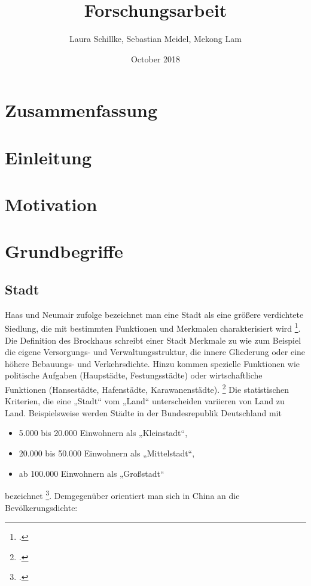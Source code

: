 \documentclass{scrartcl}
\title{Forschungsarbeit}
\author{Laura Schillke, Sebastian Meidel, Mekong Lam }
\date{October 2018}
\begin{document}
\maketitle


\newpage

\setcounter{tocdepth}{3}
\tableofcontents 



\newpage

\section{Zusammenfassung}

\section{Einleitung}

\section{Motivation}

\section{Grundbegriffe}

\subsection{Stadt}

Haas und Neumair zufolge bezeichnet man eine Stadt als eine größere verdichtete Siedlung, die mit bestimmten Funktionen und Merkmalen charakterisiert wird \footcite{HaasDefinitionWirtschaftslexikon}. Die Definition des Brockhaus schreibt einer Stadt Merkmale zu wie zum Beispiel die eigene Versorgungs- und Verwaltungsstruktur, die innere Gliederung oder eine höhere Bebauungs- und Verkehrsdichte. Hinzu kommen spezielle Funktionen wie politische Aufgaben (Haupstädte, Festungsstädte) oder wirtschaftliche Funktionen (Hansestädte, Hafenstädte, Karawanenstädte). \footcite{BrockhausStadt} Die statistischen Kriterien, die eine „Stadt“ vom „Land“ unterscheiden variieren von Land zu Land. Beispielsweise werden Städte in der Bundesrepublik Deutschland mit 
\begin{itemize}
\item 5.000 bis 20.000 Einwohnern als „Kleinstadt“,
\item 20.000 bis 50.000 Einwohnern als „Mittelstadt“,
\item ab 100.000 Einwohnern als „Großstadt“ 
\end{itemize}
bezeichnet \footcite{Institutinternationaldestatistique1887BulletinStatistique}. Demgegenüber orientiert man sich in China an die Bevölkerungsdichte: 
\end{document}
